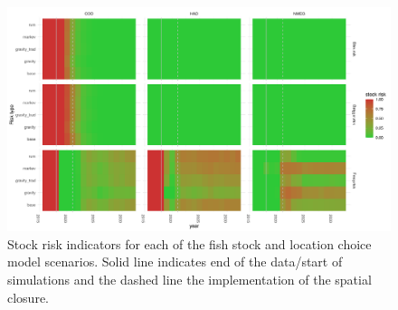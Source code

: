 \documentclass[12pt, halfline, a4paper]{ouparticle}
\begin{document}
\begin{figure}[!ht]
	\centering
	\includegraphics[width=1\linewidth]{figures/stock_risks}
	\caption{Stock risk indicators for each of the fish stock and location
		choice model scenarios. Solid
		line indicates end of the data/start of simulations and the
		dashed line the implementation of the spatial closure.} 
	\label{fig:risk}
\end{figure}	

\end{document}
